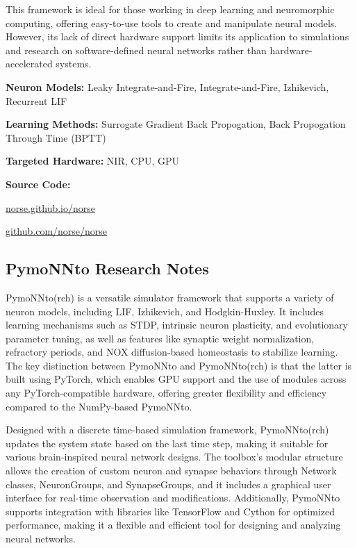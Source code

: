 This framework is ideal for those working in deep learning and neuromorphic computing, offering easy-to-use tools to create and manipulate neural models. However, its lack of direct hardware support limits its application to simulations and research on software-defined neural networks rather than hardware-accelerated systems.







\begin{tcolorbox}[enhanced,attach boxed title to top center={yshift=-3mm,yshifttext=-1mm}, colback=blue!5!white,colframe=blue!75!black,colbacktitle=red!80!black, title=Norse at a Glance,fonttitle=\bfseries, boxed title style={size=small,colframe=red!50!black} ]

\textbf{Neuron Models:} Leaky Integrate-and-Fire, Integrate-and-Fire, Izhikevich, Recurrent LIF

\textbf{Learning Methods:} Surrogate Gradient Back Propogation, Back Propogation Through Time (BPTT)  

\textbf{Targeted Hardware:} NIR, CPU, GPU 

\textbf{Source Code:} 

\href{https://norse.github.io/norse}{norse.github.io/norse}

\href{https://github.com/norse/norse}{github.com/norse/norse}
\end{tcolorbox}
\subsection*{PymoNNto Research Notes}\label{PymoNNto}

PymoNNto(rch) is a versatile simulator framework that supports a variety of neuron models, including LIF, Izhikevich, and Hodgkin-Huxley. It includes learning mechanisms such as STDP, intrinsic neuron plasticity, and evolutionary parameter tuning, as well as features like synaptic weight normalization, refractory periods, and NOX diffusion-based homeostasis to stabilize learning. The key distinction between PymoNNto and PymoNNto(rch) is that the latter is built using PyTorch, which enables GPU support and the use of modules across any PyTorch-compatible hardware, offering greater flexibility and efficiency compared to the NumPy-based PymoNNto.

Designed with a discrete time-based simulation framework, PymoNNto(rch) updates the system state based on the last time step, making it suitable for various brain-inspired neural network designs. The toolbox's modular structure allows the creation of custom neuron and synapse behaviors through Network classes, NeuronGroups, and SynapseGroups, and it includes a graphical user interface for real-time observation and modifications. Additionally, PymoNNto supports integration with libraries like TensorFlow and Cython for optimized performance, making it a flexible and efficient tool for designing and analyzing neural networks.


